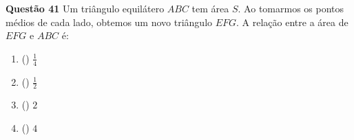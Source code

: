 {\bf Questão 41}
 Um triângulo equilátero $ABC$ tem área $S$. Ao tomarmos os pontos médios de cada lado, obtemos um novo
triângulo $EFG$. A relação entre a área de $EFG$ e $ABC$ é:

\begin{multicols}{4}
\begin{enumerate}
		\item () $\frac{1}{4}$ 
		\item () $\frac{1}{2}$ 
		\item () $2$ 
		\item () $4$ 
\end{enumerate}
\end{multicols}

